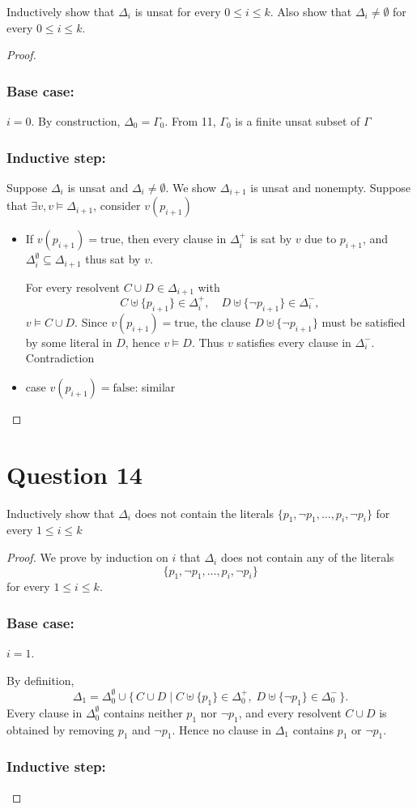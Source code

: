 \documentclass{article}
\begin{document}
    Inductively show that $\Delta_i$ is unsat for every $0 \le i \le k$.
    Also show that $\Delta_i \ne \emptyset$ for every $0 \le i \le k$.


\begin{proof}
    \subsubsection*{Base case:} $i=0$.
    By construction, $\Delta_0 = \Gamma_0$. From 11, $\Gamma_0$ is a finite unsat subset of $\Gamma$
    \subsubsection*{Inductive step:}
    Suppose $\Delta_i$ is unsat and $\Delta_i \neq \emptyset$. We show $\Delta_{i+1}$ is unsat and nonempty.
    Suppose that $\exists v, v \models \Delta_{i+1}$, consider $v(p_{i+1})$
    \begin{itemize}
    \item If $v(p_{i+1}) = \text{true}$, then every clause in $\Delta_i^{+}$ is sat by $v$ due to $p_{i+1}$, and $\Delta_i^{\emptyset} \subseteq \Delta_{i+1}$ thus sat by $v$. 
    
    For every resolvent $C \cup D \in \Delta_{i+1}$ with
    \[
    C \uplus \{p_{i+1}\} \in \Delta_i^{+}, \quad
    D \uplus \{\neg p_{i+1}\} \in \Delta_i^{-},
    \]
    $v \models C \cup D$. Since $v(p_{i+1}) = \text{true}$, the clause $D \uplus \{\neg p_{i+1}\}$ must be satisfied by some literal in $D$, hence $v \models D$. Thus $v$ satisfies every clause in $\Delta_i^{-}$. Contradiction    
    \item case $v(p_{i+1}) = \text{false}$: similar
    \end{itemize}
\end{proof}
\section*{Question 14}
Inductively show that $\Delta_i$ does not contain the literals $\{p_1, \neg p_1, \dots, p_i, \neg p_i\}$ for every $1 \le i \le k$
\begin{proof}
    We prove by induction on $i$ that $\Delta_i$ does not contain any of the literals
    \[
    \{p_1, \neg p_1, \dots, p_i, \neg p_i\}
    \]
    for every $1 \leq i \leq k$.
    
    \subsubsection*{Base case:} $i=1$.
    
    By definition,
    \[
    \Delta_1
    =
    \Delta_0^{\emptyset}
    \cup
    \{\, C \cup D \mid C \uplus \{p_1\} \in \Delta_0^{+},\; D \uplus \{\neg p_1\} \in \Delta_0^{-}\,\}.
    \]
    Every clause in $\Delta_0^{\emptyset}$ contains neither $p_1$ nor $\neg p_1$, and every resolvent $C \cup D$ is obtained by removing $p_1$ and $\neg p_1$. Hence no clause in $\Delta_1$ contains $p_1$ or $\neg p_1$.
    \subsubsection*{Inductive step:}

    \end{proof}
\end{document}
